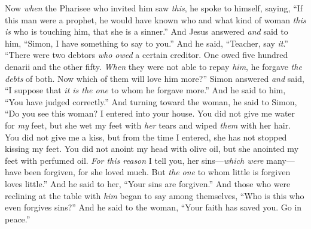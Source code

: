 \begin{biblechapter}
\verse Now \textit{when} the Pharisee who invited him saw \textit{this}, he spoke to himself, saying, “If this man were a prophet, he would have known who and what kind of woman \textit{this is} who is touching him, that she is a sinner.”
\verse And Jesus answered \textit{and} said to him, “Simon, I have something to say to you.” And he said, “Teacher, say \textit{it}.”
\verse “There were two debtors \textit{who owed} a certain creditor. One owed five hundred denarii and the other fifty.
\verse \textit{When} they were not able to repay \textit{him}, he forgave \textit{the debts} of both. Now which of them will love him more?”
\verse Simon answered \textit{and} said, “I suppose that \textit{it is the one} to whom he forgave more.” And he said to him, “You have judged correctly.”
\verse And turning toward the woman, he said to Simon, “Do you see this woman? I entered into your house. You did not give me water for \textit{my} feet, but she wet my feet with \textit{her} tears and wiped \textit{them} with her hair.
\verse You did not give me a kiss, but from the time I entered, she has not stopped kissing my feet.
\verse You did not anoint my head with olive oil, but she anointed my feet with perfumed oil.
\verse \textit{For this reason} I tell you, her sins—\textit{which were} many—have been forgiven, for she loved much. But \textit{the one} to whom little is forgiven loves little.”
\verse And he said to her, “Your sins are forgiven.”
\verse And those who were reclining at the table with \textit{him} began to say among themselves, “Who is this who even forgives sins?”
\verse And he said to the woman, “Your faith has saved you. Go in peace.”
\end{biblechapter}

